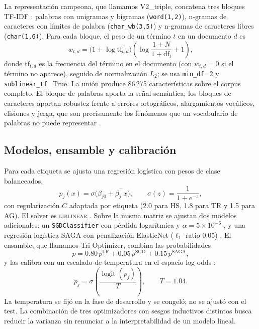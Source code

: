 La representación campeona, que llamamos V2\_triple, concatena tres bloques
TF-IDF \cite{joachims1998text}: palabras con unigramas y bigramas
(\texttt{word(1,2)}), n-gramas de caracteres con límites de palabra
(\texttt{char\_wb(3,5)}) y n-gramas de caracteres libres
(\texttt{char(1,6)}). Para cada bloque, el peso de un término $t$ en un
documento $d$ es
\begin{equation}
w_{t,d} = \bigl(1+\log \mathrm{tf}_{t,d}\bigr)
\left(\log\frac{1+N}{1+\mathrm{df}_t}+1\right),
\label{eq:tfidf}
\end{equation}
donde $\mathrm{tf}_{t,d}$ es la frecuencia del término en el documento (con
$w_{t,d}=0$ si el término no aparece), seguido de normalización $L_2$; se usa \texttt{min\_df}=2 y
\texttt{sublinear\_tf}=True. La unión produce 86\,275 características sobre el
corpus completo. El bloque de palabras aporta la señal semántica; los bloques
de caracteres aportan robustez frente a errores ortográficos, alargamientos
vocálicos, elisiones y jerga, que son precisamente los fenómenos que un
vocabulario de palabras no puede representar \cite{cavnar1994ngram,mcnamee2004character}.

\subsection{Modelos, ensamble y calibración}

Para cada etiqueta se ajusta una regresión logística con pesos de clase
balanceados,
\begin{equation}
p_j(x)=\sigma\bigl(\beta_{j0}+\beta_j^{\top}x\bigr), \qquad
\sigma(z)=\frac{1}{1+e^{-z}},
\label{eq:logit}
\end{equation}
con regularización $C$ adaptada por etiqueta (2.0 para HS, 1.8 para TR y 1.5
para AG). El solver es \textsc{liblinear} \cite{fan2008liblinear}. Sobre la
misma matriz se ajustan dos modelos adicionales: un \texttt{SGDClassifier}
con pérdida logarítmica y $\alpha=5\times10^{-6}$ \cite{bottou2010large}, y
una regresión logística SAGA con penalización ElasticNet
($\ell_1$-ratio 0.05) \cite{defazio2014saga,zou2005regularization}. El
ensamble, que llamamos Tri-Optimizer, combina las probabilidades
\begin{equation}
p = 0.80\,p^{\mathrm{LR}} + 0.05\,p^{\mathrm{SGD}} + 0.15\,p^{\mathrm{SAGA}},
\label{eq:ensemble}
\end{equation}
y las calibra con un escalado de temperatura en el espacio log-odds
\cite{guo2017calibration}:
\begin{equation}
\tilde p_j = \sigma\!\left(\frac{\operatorname{logit}(p_j)}{T}\right),
\qquad T=1.04.
\label{eq:temperatura}
\end{equation}
La temperatura se fijó en la fase de desarrollo y se congeló; no se ajustó
con el test. La combinación de tres optimizadores con sesgos inductivos
distintos busca reducir la varianza sin renunciar a la interpretabilidad de
un modelo lineal.


